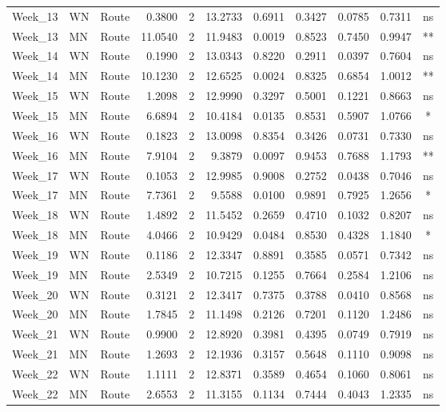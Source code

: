 \documentclass[
  12pt,
  letterpaper,
]{article}
\begin{document}
\begin{longtable}{lllrrrlrrrc}
Week\_13 & WN & Route & 0.3800 & 2 & 13.2733 & 0.6911 & 0.3427 & 0.0785 & 0.7311 & ns \\ 
Week\_13 & MN & Route & 11.0540 & 2 & 11.9483 & 0.0019 & 0.8523 & 0.7450 & 0.9947 & ** \\ 
Week\_14 & WN & Route & 0.1990 & 2 & 13.0343 & 0.8220 & 0.2911 & 0.0397 & 0.7604 & ns \\ 
Week\_14 & MN & Route & 10.1230 & 2 & 12.6525 & 0.0024 & 0.8325 & 0.6854 & 1.0012 & ** \\ 
Week\_15 & WN & Route & 1.2098 & 2 & 12.9990 & 0.3297 & 0.5001 & 0.1221 & 0.8663 & ns \\ 
Week\_15 & MN & Route & 6.6894 & 2 & 10.4184 & 0.0135 & 0.8531 & 0.5907 & 1.0766 & * \\ 
Week\_16 & WN & Route & 0.1823 & 2 & 13.0098 & 0.8354 & 0.3426 & 0.0731 & 0.7330 & ns \\ 
Week\_16 & MN & Route & 7.9104 & 2 & 9.3879 & 0.0097 & 0.9453 & 0.7688 & 1.1793 & ** \\ 
Week\_17 & WN & Route & 0.1053 & 2 & 12.9985 & 0.9008 & 0.2752 & 0.0438 & 0.7046 & ns \\ 
Week\_17 & MN & Route & 7.7361 & 2 & 9.5588 & 0.0100 & 0.9891 & 0.7925 & 1.2656 & * \\ 
Week\_18 & WN & Route & 1.4892 & 2 & 11.5452 & 0.2659 & 0.4710 & 0.1032 & 0.8207 & ns \\ 
Week\_18 & MN & Route & 4.0466 & 2 & 10.9429 & 0.0484 & 0.8530 & 0.4328 & 1.1840 & * \\ 
Week\_19 & WN & Route & 0.1186 & 2 & 12.3347 & 0.8891 & 0.3585 & 0.0571 & 0.7342 & ns \\ 
Week\_19 & MN & Route & 2.5349 & 2 & 10.7215 & 0.1255 & 0.7664 & 0.2584 & 1.2106 & ns \\ 
Week\_20 & WN & Route & 0.3121 & 2 & 12.3417 & 0.7375 & 0.3788 & 0.0410 & 0.8568 & ns \\ 
Week\_20 & MN & Route & 1.7845 & 2 & 11.1498 & 0.2126 & 0.7201 & 0.1120 & 1.2486 & ns \\ 
Week\_21 & WN & Route & 0.9900 & 2 & 12.8920 & 0.3981 & 0.4395 & 0.0749 & 0.7919 & ns \\ 
Week\_21 & MN & Route & 1.2693 & 2 & 12.1936 & 0.3157 & 0.5648 & 0.1110 & 0.9098 & ns \\ 
Week\_22 & WN & Route & 1.1111 & 2 & 12.8371 & 0.3589 & 0.4654 & 0.1060 & 0.8061 & ns \\ 
Week\_22 & MN & Route & 2.6553 & 2 & 11.3155 & 0.1134 & 0.7444 & 0.4043 & 1.2335 & ns \\ 
\bottomrule
\end{longtable}
\endgroup
\end{document}
